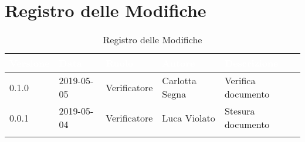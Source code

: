 \newpage

\section*{Registro delle Modifiche}

\begin{center}
\begin{longtable}[c]{|m{}|m{}|m{}|m{}|p{}|}
\hline
\rowcolor{bluelogo}\textbf{\textcolor{white}{Versione}} & \textbf{\textcolor{white}{Data}} & \textbf{\textcolor{white}{Ruolo}} & \textbf{\textcolor{white}{Autore}} & \textbf{\textcolor{white}{Descrizione}}\\
\hline \hline
\endfirsthead
\rowcolor{grigio} 0.1.0 & 2019-05-05 & Verificatore & Carlotta Segna & Verifica documento \\
\hline
0.0.1 & 2019-05-04 & Verificatore & Luca Violato & Stesura documento \\
\hline
\caption{Registro delle Modifiche}
\end{longtable}
\end{center}
